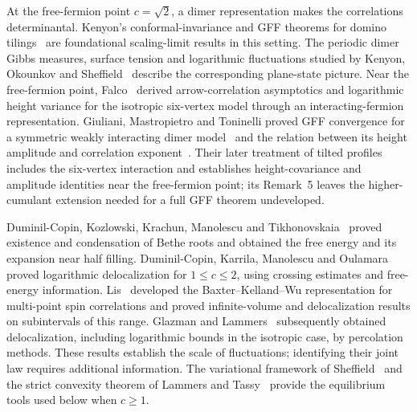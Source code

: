 At the free-fermion point \(c=\sqrt2\), a dimer representation makes
the correlations determinantal. Kenyon's conformal-invariance and GFF
theorems for domino tilings~\cite{Kenyon2000,Kenyon2001} are foundational
scaling-limit results in this setting. The periodic dimer Gibbs measures,
surface tension and logarithmic fluctuations studied by Kenyon, Okounkov
and Sheffield~\cite{KOS2006} describe the corresponding plane-state
picture. Near the free-fermion point, Falco~\cite{Falco2013} derived
arrow-correlation asymptotics and logarithmic height variance for the
isotropic six-vertex model through an interacting-fermion representation.
Giuliani, Mastropietro and Toninelli proved GFF convergence for a symmetric
weakly interacting dimer model~\cite{GMT2017} and the relation between its
height amplitude and correlation exponent~\cite{GMTHaldane2017}.
Their later treatment of tilted profiles~\cite[Section~2.3 and Theorem~2]{GMT2020}
includes the six-vertex interaction and establishes height-covariance and
amplitude identities near the free-fermion point; its Remark~5 leaves the
higher-cumulant extension needed for a full GFF theorem undeveloped.

Duminil-Copin, Kozlowski, Krachun, Manolescu and
Tikhonovskaia~\cite{DCKKMT2022} proved existence and condensation of Bethe
roots and obtained the free energy and its expansion near half filling.
Duminil-Copin, Karrila, Manolescu and Oulamara~\cite{DCKMO2024} proved
logarithmic delocalization for \(1\le c\le2\), using crossing estimates
and free-energy information. Lis~\cite{Lis2021} developed the
Baxter--Kelland--Wu representation for multi-point spin correlations and
proved infinite-volume and delocalization results on subintervals of this
range. Glazman and Lammers~\cite{GlazmanLammers2025} subsequently obtained
delocalization, including logarithmic bounds in the isotropic case, by
percolation methods. These results establish the scale of fluctuations;
identifying their joint law requires additional information. The
variational framework of Sheffield~\cite{Sheffield2005} and the strict
convexity theorem of Lammers and Tassy~\cite{LammersTassy2024} provide the
equilibrium tools used below when \(c\ge1\).

